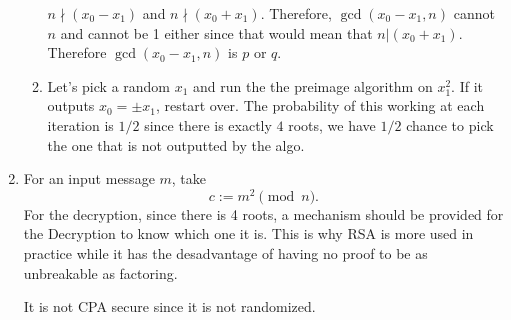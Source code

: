 \begin{solution}
\begin{enumerate}
\begin{enumerate}
			$n \nmid (x_0-x_1)$ and $n \nmid (x_0 + x_1)$.
			Therefore, $\gcd(x_0-x_1,n)$ cannot $n$ and cannot be 1 either
			since that would mean that $n | (x_0 + x_1)$.
			Therefore $\gcd(x_0-x_1,n)$ is $p$ or $q$.
			\item
			Let's pick a random $x_1$ and run the the preimage algorithm on $x_1^2$.
			If it outputs $x_0 = \pm x_1$, restart over.
			The probability of this working at each iteration is $1/2$ since there is exactly $4$ roots,
			we have $1/2$ chance to pick the one that is not outputted by the algo.
		\end{enumerate}
		\item
		For an input message $m$, take
		\[ c := m^2 \pmod{n}. \]
		For the decryption, since there is 4 roots, a mechanism should be provided for the Decryption to know which one it is.
		This is why RSA is more used in practice while it has the desadvantage of having no proof to be as unbreakable as factoring.
		
		It is not CPA secure since it is not randomized.
	\end{enumerate}
\end{solution}


